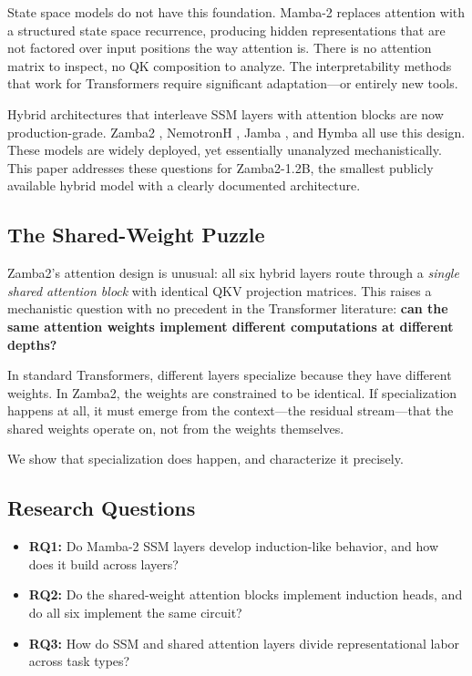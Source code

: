 \documentclass[11pt,a4paper]{article}
\begin{document}
State space models do not have this foundation. Mamba-2 \citep{dao2024transformers} replaces attention with a structured state space recurrence, producing hidden representations that are not factored over input positions the way attention is. There is no attention matrix to inspect, no QK composition to analyze. The interpretability methods that work for Transformers require significant adaptation---or entirely new tools.

Hybrid architectures that interleave SSM layers with attention blocks are now production-grade. Zamba2 \citep{zyphra2024zamba2}, NemotronH \citep{nvidia2025nemotronh}, Jamba \citep{lieber2024jamba}, and Hymba \citep{nvidia2024hymba} all use this design. These models are widely deployed, yet essentially unanalyzed mechanistically. This paper addresses these questions for Zamba2-1.2B, the smallest publicly available hybrid model with a clearly documented architecture.

\subsection{The Shared-Weight Puzzle}

Zamba2's attention design is unusual: all six hybrid layers route through a \emph{single shared attention block} with identical QKV projection matrices. This raises a mechanistic question with no precedent in the Transformer literature: \textbf{can the same attention weights implement different computations at different depths?}

In standard Transformers, different layers specialize because they have different weights. In Zamba2, the weights are constrained to be identical. If specialization happens at all, it must emerge from the context---the residual stream---that the shared weights operate on, not from the weights themselves.

We show that specialization does happen, and characterize it precisely.

\subsection{Research Questions}

\begin{itemize}[leftmargin=1.5em]
  \item \textbf{RQ1:} Do Mamba-2 SSM layers develop induction-like behavior, and how does it build across layers?
  \item \textbf{RQ2:} Do the shared-weight attention blocks implement induction heads, and do all six implement the same circuit?
  \item \textbf{RQ3:} How do SSM and shared attention layers divide representational labor across task types?
\end{itemize}
\end{document}
